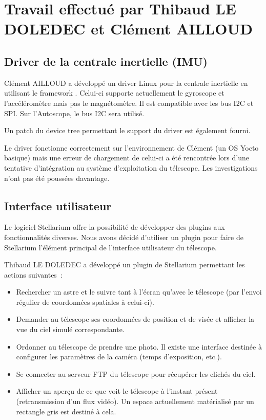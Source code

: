 \chapter{Travail effectué par Thibaud LE DOLEDEC et Clément AILLOUD}

\section{Driver de la centrale inertielle (IMU)}

Clément AILLOUD a développé un driver Linux pour la centrale inertielle en utilisant le framework . Celui-ci supporte actuellement le gyroscope et l'accéléromètre mais pas le magnétomètre. Il est compatible avec les bus I2C et SPI. Sur l'Autoscope, le bus I2C sera utilisé.

Un patch du device tree permettant le support du driver est également fourni.

\vspace{1cm}

Le driver fonctionne correctement sur l'environnement de Clément (un OS Yocto basique) mais une erreur de chargement de celui-ci a été rencontrée lors d'une tentative d'intégration au système d'exploitation du télescope. Les investigations n'ont pas été poussées davantage.

\section{Interface utilisateur}

Le logiciel Stellarium offre la possibilité de développer des plugins aux fonctionnalités diverses. Nous avons décidé d'utiliser un plugin pour faire de Stellarium l'élément principal de l'interface utilisateur du télescope.

\vspace{1cm}

Thibaud LE DOLEDEC a développé un plugin de Stellarium permettant les actions suivantes~:
\begin{itemize}[label=$\bullet$]
	\item Rechercher un astre et le suivre tant à l'écran qu'avec le télescope (par l'envoi régulier de coordonnées spatiales à celui-ci).
	\item Demander au télescope ses coordonnées de position et de visée et afficher la vue du ciel simulé correspondante.
	\item Ordonner au télescope de prendre une photo. Il existe une interface destinée à configurer les paramètres de la caméra (temps d'exposition, etc.).
	\item Se connecter au serveur FTP du télescope pour récupérer les clichés du ciel.
	\item Afficher un aperçu de ce que voit le télescope à l'instant présent (retransmission d'un flux vidéo). Un espace actuellement matérialisé par un rectangle gris est destiné à cela.
	\end{itemize}

